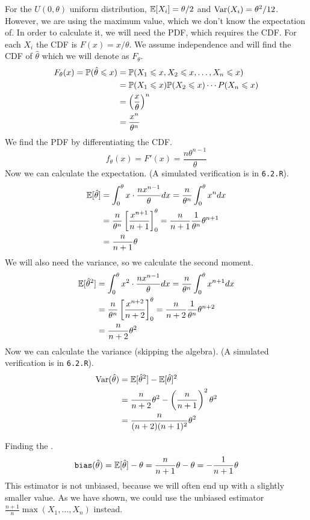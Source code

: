 For the $U(0,\theta)$ uniform distribution, $\E[X_i] = \theta/2$ and $\V(X_i) = \theta^2/12$.
However, we are using the maximum value, which we don't know the expectation of. In order to
calculate it, we will need the PDF, which requires the CDF. For each $X_i$ the CDF is $F(x) = x/\theta$.
We assume independence and will find the CDF of $\hat{\theta}$ which we will denote as $F_\theta$.
\begin{align*}
    F_\theta(x) = \P(\hat{\theta} \leq x)
    &= \P(X_1\leq x, X_2\leq x, \ldots, X_n\leq x) \\
    &= \P(X_1\leq x)\P(X_2\leq x)\cdots P(X_n\leq x) \\
    &= \left(\frac{x}{\theta}\right)^n \\
    &= \frac{x^n}{\theta^n}
\end{align*}
We find the PDF by differentiating the CDF.
$$
f_\theta(x) = F'(x) = \frac{n\theta^{n-1}}{\theta}
$$
Now we can calculate the expectation. (A simulated verification is in \texttt{6.2.R}).
\begin{align*}
    \E[\hat{\theta}] &= \int_0^\theta x\cdot \frac{n x^{n-1}}{\theta} dx
    = \frac{n}{\theta^n}\int_0^\theta x^n dx \\
    &= \frac{n}{\theta^n}\left[\frac{x^{n+1}}{n+1}\right]_0^\theta
    =\frac{n}{n+1}\frac{1}{\theta^n}\theta^{n+1} \\
    &= \frac{n}{n+1}\theta
\end{align*}
We will also need the variance, so we calculate the second moment.
\begin{align*}
    \E[\hat{\theta}^2] &= \int_0^\theta x^2\cdot \frac{n x^{n-1}}{\theta} dx
    = \frac{n}{\theta^n}\int_0^\theta x^{n+1} dx \\
    &= \frac{n}{\theta^n}\left[\frac{x^{n+2}}{n+2}\right]_0^\theta
    =\frac{n}{n+2}\frac{1}{\theta^n}\theta^{n+2} \\
    &= \frac{n}{n+2}\theta^2
\end{align*}
Now we can calculate the variance (skipping the algebra).
(A simulated verification is in \texttt{6.2.R}).
\begin{align*}
    \V(\hat{\theta}) &= \E[\hat{\theta}^2] - \E[\hat{\theta}]^2\\
    &= \frac{n}{n+2}\theta^2 - \left(\frac{n}{n+1}\right)^2\theta^2 \\
    &= \frac{n}{(n+2)(n+1)^2}\theta^2
\end{align*}

\newpage\noindent
Finding the \bias.
$$
\bias(\thetah) = \E[\thetah] - \theta = \frac{n}{n+1}\theta - \theta = -\frac{1}{n+1}\theta
$$
This estimator is not unbiased, because we will often end up with a slightly smaller value.
As we have shown, we could use the unbiased estimator $\frac{n+1}{n}\max(X_1,\ldots,X_n)$
instead.

